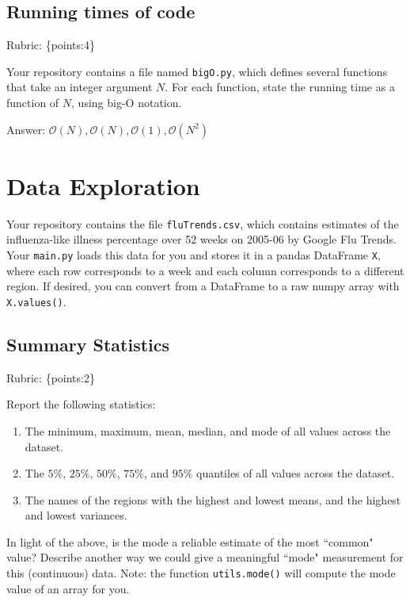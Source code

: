 \documentclass{article}
\def\ans#1{\par\gre{Answer: #1}}
\def\rubric#1{\gre{Rubric: \{#1\}}}{}
\def\blu#1{{\color{blu}#1}}
\def\gre#1{{\color{gre}#1}}
\def\enum#1{\begin{enumerate}#1\end{enumerate}}
\begin{document}
	\subsection{Running times of code}
	\rubric{points:4}
	
	Your repository contains a file named \texttt{bigO.py}, which defines several functions
	that take an integer argument $N$. For each function, \blu{state the running time as a function of $N$, using big-O notation}.
	\ans{$\mathcal{O}(N), \mathcal{O}(N), \mathcal{O}(1), \mathcal{O}(N^2)$}
	
	
	\section{Data Exploration}
	
	
	Your repository contains the file \texttt{fluTrends.csv}, which contains estimates
	of the influenza-like illness percentage over 52 weeks on 2005-06 by Google Flu Trends.
	Your \texttt{main.py} loads this data for you and stores it in a pandas DataFrame \texttt{X},
	where each row corresponds to a week and each column
	corresponds to a different
	region. If desired, you can convert from a DataFrame to a raw numpy array with \texttt{X.values()}.
	
	\subsection{Summary Statistics}
	\rubric{points:2}
	
	\blu{Report the following statistics}:
	\enum{
		\item The minimum, maximum, mean, median, and mode of all values across the dataset.
		\item The $5\%$, $25\%$, $50\%$, $75\%$, and $95\%$ quantiles of all values across the dataset.
		\item The names of the regions with the highest and lowest means, and the highest and lowest variances.%
	}
	In light of the above, \blu{is the mode a reliable estimate of the most ``common" value? Describe another way we could give a meaningful ``mode" measurement for this (continuous) data.} Note: the function \texttt{utils.mode()} will compute the mode value of an array for you.
	
	
\end{document}
